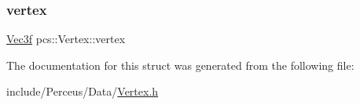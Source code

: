 \subsubsection{\texorpdfstring{vertex}{vertex}}
{\footnotesize\ttfamily \hyperlink{namespacepcs_a68e0f517680976c17c810ffe6952cbab}{Vec3f} pcs\+::\+Vertex\+::vertex}



The documentation for this struct was generated from the following file\+:\begin{DoxyCompactItemize}
\item 
include/\+Perceus/\+Data/\hyperlink{Vertex_8h}{Vertex.\+h}\end{DoxyCompactItemize}

